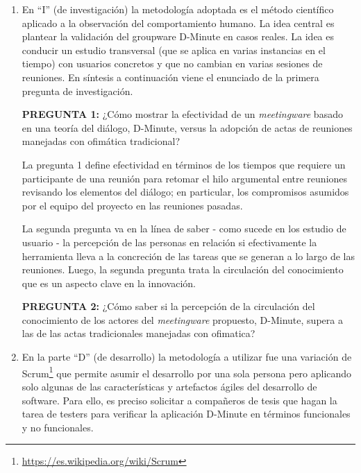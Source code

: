 \begin{enumerate}[A]
        \item En “I” (de investigación) la metodología adoptada es el método científico aplicado a la observación del comportamiento humano. La idea central es plantear la validación del groupware D-Minute en casos reales. La idea es conducir un estudio transversal (que se aplica en varias instancias en el tiempo) con usuarios concretos y que no cambian en varias sesiones de reuniones. En síntesis a continuación viene el enunciado de la primera pregunta de investigación.\newline
        
\textbf{PREGUNTA 1:} ¿Cómo mostrar la efectividad de un \textsl{meetingware} basado en una teoría del diálogo, D-Minute, versus la adopción de actas de reuniones manejadas con ofimática tradicional?\newline

La pregunta 1 define efectividad en términos de los tiempos que requiere un participante de una reunión para retomar el hilo argumental entre reuniones revisando los elementos del diálogo; en particular, los compromisos asumidos por el equipo del proyecto en las reuniones pasadas.\newline 

La segunda pregunta va en la línea de saber - como sucede en los estudio de usuario - la percepción de las personas en relación si efectivamente la herramienta lleva a la concreción de las tareas que se generan a lo largo de las reuniones. Luego, la segunda pregunta trata la circulación del conocimiento que es un aspecto clave en la innovación.\newline

\textbf{PREGUNTA 2:} ¿Cómo saber si la percepción de la circulación del conocimiento de los actores del \textsl{meetingware} propuesto, D-Minute, supera a las de las actas tradicionales manejadas con ofimatica?
        
	\item En la parte “D” (de desarrollo) la metodología a utilizar fue una variación de Scrum\footnote{\url{https://es.wikipedia.org/wiki/Scrum}} que permite asumir el desarrollo por una sola persona pero aplicando solo algunas de las características y artefactos ágiles del desarrollo de software. Para ello, es preciso solicitar a compañeros de tesis que hagan la tarea de testers para verificar la aplicación D-Minute en términos funcionales y no funcionales.


\end{enumerate}
